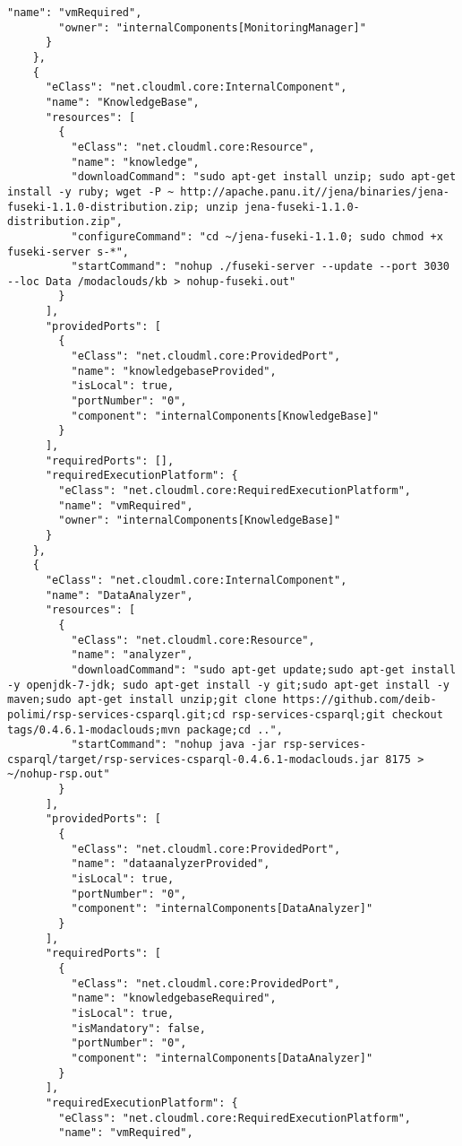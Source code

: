 \begin{lstlisting}[mathescape,caption={The .json to deplot the \mm on Flexiant},label={lst:mpflexi}]
        "name": "vmRequired",
        "owner": "internalComponents[MonitoringManager]"
      }
    },
    {
      "eClass": "net.cloudml.core:InternalComponent",
      "name": "KnowledgeBase",
      "resources": [
        {
          "eClass": "net.cloudml.core:Resource",
          "name": "knowledge",
          "downloadCommand": "sudo apt-get install unzip; sudo apt-get install -y ruby; wget -P ~ http://apache.panu.it//jena/binaries/jena-fuseki-1.1.0-distribution.zip; unzip jena-fuseki-1.1.0-distribution.zip",
          "configureCommand": "cd ~/jena-fuseki-1.1.0; sudo chmod +x fuseki-server s-*",
          "startCommand": "nohup ./fuseki-server --update --port 3030 --loc Data /modaclouds/kb > nohup-fuseki.out"
        }
      ],
      "providedPorts": [
        {
          "eClass": "net.cloudml.core:ProvidedPort",
          "name": "knowledgebaseProvided",
          "isLocal": true,
          "portNumber": "0",
          "component": "internalComponents[KnowledgeBase]"
        }
      ],
      "requiredPorts": [],
      "requiredExecutionPlatform": {
        "eClass": "net.cloudml.core:RequiredExecutionPlatform",
        "name": "vmRequired",
        "owner": "internalComponents[KnowledgeBase]"
      }
    },
    {
      "eClass": "net.cloudml.core:InternalComponent",
      "name": "DataAnalyzer",
      "resources": [
        {
          "eClass": "net.cloudml.core:Resource",
          "name": "analyzer",
          "downloadCommand": "sudo apt-get update;sudo apt-get install -y openjdk-7-jdk; sudo apt-get install -y git;sudo apt-get install -y maven;sudo apt-get install unzip;git clone https://github.com/deib-polimi/rsp-services-csparql.git;cd rsp-services-csparql;git checkout tags/0.4.6.1-modaclouds;mvn package;cd ..",
          "startCommand": "nohup java -jar rsp-services-csparql/target/rsp-services-csparql-0.4.6.1-modaclouds.jar 8175 > ~/nohup-rsp.out" 
        }
      ],
      "providedPorts": [
        {
          "eClass": "net.cloudml.core:ProvidedPort",
          "name": "dataanalyzerProvided",
          "isLocal": true,
          "portNumber": "0",
          "component": "internalComponents[DataAnalyzer]"
        }
      ],
      "requiredPorts": [
        {
          "eClass": "net.cloudml.core:ProvidedPort",
          "name": "knowledgebaseRequired",
          "isLocal": true,
          "isMandatory": false,
          "portNumber": "0",
          "component": "internalComponents[DataAnalyzer]"
        }
      ],
      "requiredExecutionPlatform": {
        "eClass": "net.cloudml.core:RequiredExecutionPlatform",
        "name": "vmRequired",

\end{lstlisting}

